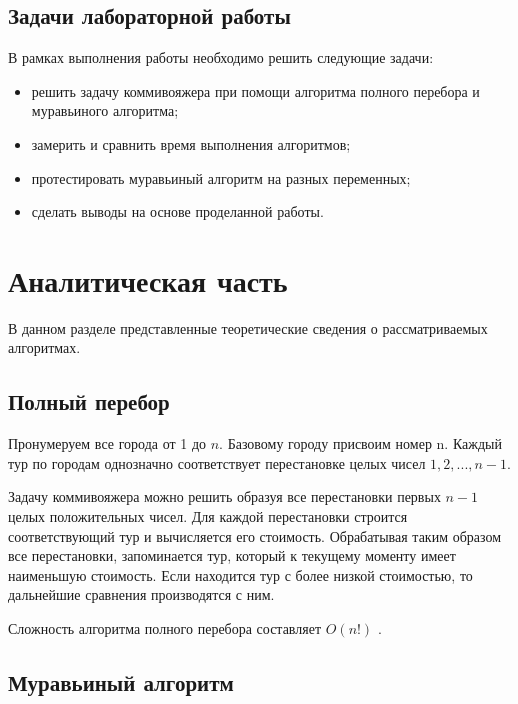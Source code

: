 \documentclass[12pt]{report}
\begin{document}
\section*{Задачи лабораторной работы}
	
В рамках выполнения работы необходимо решить следующие задачи:
	
\begin{itemize}
	\item решить задачу коммивояжера при помощи алгоритма полного перебора и муравьиного алгоритма;
	\item замерить и сравнить время выполнения алгоритмов;
	\item протестировать муравьиный алгоритм на разных переменных;
	\item сделать выводы на основе проделанной работы.
\end{itemize}
	
\chapter{Аналитическая часть}
	
В данном разделе представленные теоретические сведения о рассматриваемых алгоритмах.

\section{Полный перебор}

Пронумеруем все города от 1 до $n$. Базовому городу присвоим номер n. Каждый тур по городам однозначно соответствует перестановке целых чисел $1, 2, ..., n-1$.


Задачу коммивояжера можно решить образуя все перестановки первых $n-1$ целых положительных чисел. Для каждой перестановки строится соответствующий тур и вычисляется его стоимость. Обрабатывая таким образом все перестановки, запоминается тур, который к текущему моменту имеет наименьшую стоимость. Если находится тур с более низкой стоимостью, то дальнейшие сравнения производятся с ним.


Сложность алгоритма полного перебора составляет $O(n!)$ \cite{goodman}.
	
\section{Муравьиный алгоритм}
\end{document}
